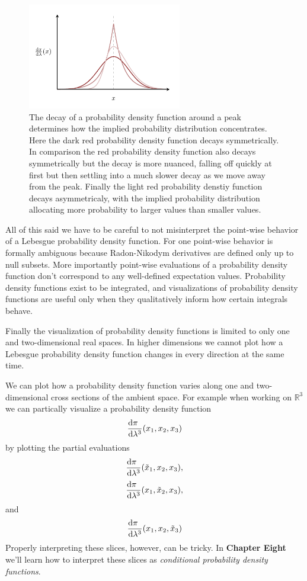 \documentclass[
  letterpaper,
  DIV=11,
  numbers=noendperiod]{scrartcl}
\begin{document}
\begin{figure}

{\centering \includegraphics[width=0.6\textwidth,height=\textheight]{figures/varying_shapes/varying_shapes.pdf}

}

\caption{\label{fig-varying-shapes}The decay of a probability density
function around a peak determines how the implied probability
distribution concentrates. Here the dark red probability density
function decays symmetrically. In comparison the red probability density
function also decays symmetrically but the decay is more nuanced,
falling off quickly at first but then settling into a much slower decay
as we move away from the peak. Finally the light red probability denstiy
function decays asymmetricaly, with the implied probability distribution
allocating more probability to larger values than smaller values.}

\end{figure}

All of this said we have to be careful to not misinterpret the
point-wise behavior of a Lebesgue probability density function. For one
point-wise behavior is formally ambiguous because Radon-Nikodym
derivatives are defined only up to null subsets. More importantly
point-wise evaluations of a probability density function don't
correspond to any well-defined expectation values. Probability density
functions exist to be integrated, and visualizations of probability
density functions are useful only when they qualitatively inform how
certain integrals behave.

Finally the visualization of probability density functions is limited to
only one and two-dimensional real spaces. In higher dimensions we cannot
plot how a Lebesgue probability density function changes in every
direction at the same time.

We can plot how a probability density function varies along one and
two-dimensional cross sections of the ambient space. For example when
working on \(\mathbb{R}^{3}\) we can partically visualize a probability
density function \[
\frac{ \mathrm{d} \pi \hphantom{ {}^{3} } }{ \mathrm{d} \lambda^{3} }
(x_{1}, x_{2}, x_{3})
\] by plotting the partial evaluations \[
\frac{ \mathrm{d} \pi \hphantom{ {}^{3} } }{ \mathrm{d} \lambda^{3} }
(\tilde{x}_{1}, x_{2}, x_{3}),
\] \[
\frac{ \mathrm{d} \pi \hphantom{ {}^{3} } }{ \mathrm{d} \lambda^{3} }
(x_{1}, \tilde{x}_{2}, x_{3}),
\] and \[
\frac{ \mathrm{d} \pi \hphantom{ {}^{3} } }{ \mathrm{d} \lambda^{3} }
(x_{1}, x_{2}, \tilde{x}_{3})
\] Properly interpreting these slices, however, can be tricky. In
\textbf{Chapter Eight} we'll learn how to interpret these slices as
\emph{conditional probability density functions}.
\end{document}

